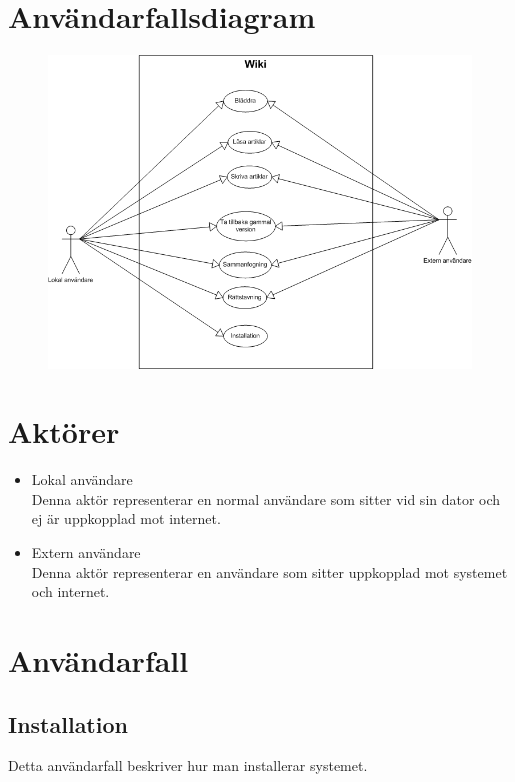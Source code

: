 \section{Användarfallsdiagram}
 \begin{figure}[H] %
  \centering
  \includegraphics[scale=0.50]{use-case-diagram.png}
\end{figure}
\section{Aktörer}
\begin{itemize}
	\item Lokal användare
	\\Denna aktör representerar en normal användare som sitter vid sin dator och ej är uppkopplad mot internet.
	\item Extern användare
	\\Denna aktör representerar en användare som sitter uppkopplad mot systemet och internet.
\end{itemize}
\newpage
\section{Användarfall}
\subsection{Installation}
Detta användarfall beskriver hur man installerar systemet.

